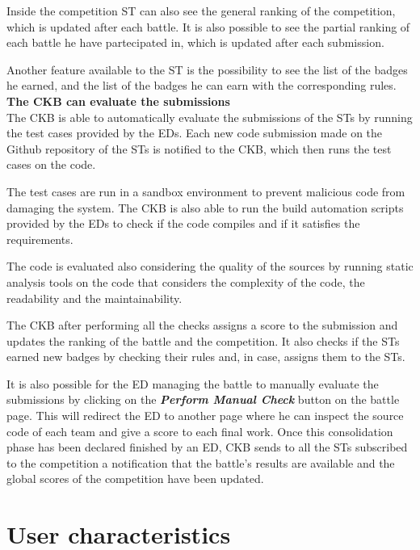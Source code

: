 Inside the competition ST can also see the general ranking of the competition, which is updated after each battle. It is also possible to see the partial ranking of each battle he have partecipated in, which is updated after each submission. 

Another feature available to the ST is the possibility to see the list of the badges he earned, and the list of the badges he can earn with the corresponding rules. \\


\textbf{The CKB can evaluate the submissions} \\
The CKB is able to automatically evaluate the submissions of the STs by running the test cases provided by the EDs. Each new code submission made on the Github repository of the STs is notified to the CKB, which then runs the test cases on the code.

The test cases are run in a sandbox environment to prevent malicious code from damaging the system. The CKB is also able to run the build automation scripts provided by the EDs to check if the code compiles and if it satisfies the requirements. 

The code is evaluated also considering the quality of the sources by running static analysis tools on the code that considers the complexity of the code, the readability and the maintainability.

The CKB after performing all the checks assigns a score to the submission and updates the ranking of the battle and the competition. It also checks if the STs earned new badges by checking their rules and, in case, assigns them to the STs.

It is also possible for the ED managing the battle to manually evaluate the submissions by clicking on the \textbf{\textit{Perform Manual Check}} button on the battle page. This will redirect the ED to another page where he can inspect the source code of each team and give a score to each final work. Once this consolidation phase has been declared finished by an ED, CKB sends to all the STs subscribed to the competition a notification that the battle's results are available and the global scores of the competition have been updated.

\newpage

\section{User characteristics}
\label{s:User_characteristics}%

